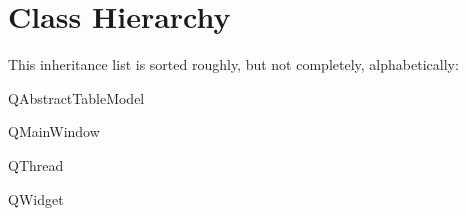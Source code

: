 \section{Class Hierarchy}
This inheritance list is sorted roughly, but not completely, alphabetically\+:\begin{DoxyCompactList}
\item Q\+Abstract\+Table\+Model\begin{DoxyCompactList}
\item {}
\end{DoxyCompactList}
\item Q\+Main\+Window\begin{DoxyCompactList}
\item {}
\end{DoxyCompactList}
\item Q\+Thread\begin{DoxyCompactList}
\item {}
\end{DoxyCompactList}
\item Q\+Widget\begin{DoxyCompactList}
\item {}
\end{DoxyCompactList}
\end{DoxyCompactList}
